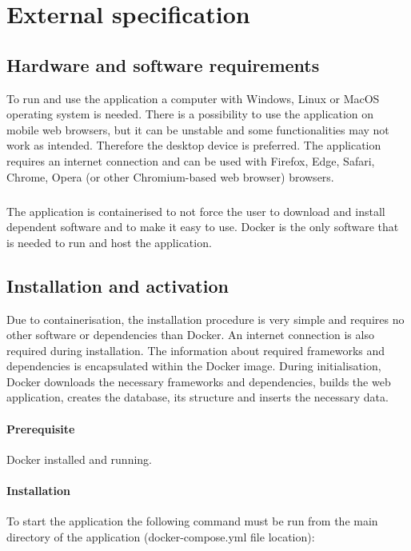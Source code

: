 \documentclass[a4paper,twoside,12pt]{book}
\begin{document}
\chapter{External specification}
\section{Hardware and software requirements}
To run and use the application a computer with Windows, Linux or MacOS operating system is needed. There is a possibility to use the application on mobile web browsers, but it can be unstable and some functionalities may not work as intended. Therefore the desktop device is preferred. The application requires an internet connection and can be used with Firefox, Edge, Safari, Chrome, Opera (or other Chromium-based web browser) browsers.
\paragraph{}
The application is containerised to not force the user to download and install dependent software and to make it easy to use. Docker is the only software that is needed to run and host the application.
\section{Installation and activation}
Due to containerisation, the installation procedure is very simple and requires no other software or dependencies than Docker. An internet connection is also required during installation. The information about required frameworks and dependencies is encapsulated within the Docker image. During initialisation, Docker downloads the necessary frameworks and dependencies, builds the web application, creates the database, its structure and inserts the necessary data.

\subsubsection{Prerequisite}
Docker installed and running.

\subsubsection{Installation}
To start the application the following command must be run from the main directory of the application (docker-compose.yml file location):

\paragraph{}
\end{document}
